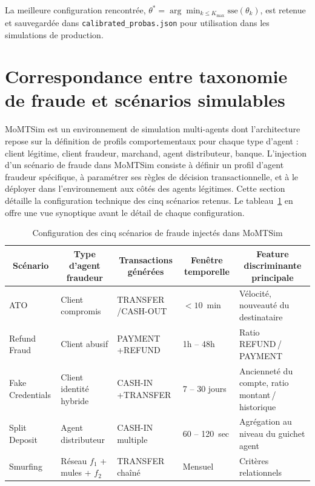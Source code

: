 \documentclass[11pt,a4paper,oneside]{report}
\theoremstyle{definition}
\theoremstyle{remark}
\begin{document}
La meilleure configuration rencontrée, $\theta^* = \arg\min_{k \leq K_\text{max}} \text{sse}(\theta_k)$, est retenue et sauvegardée dans \texttt{calibrated\_probas.json} pour utilisation dans les simulations de production.

\section{Correspondance entre taxonomie de fraude et scénarios simulables}
\label{sec:scenarios}

MoMTSim est un environnement de simulation multi-agents dont l'architecture repose sur la définition de profils comportementaux pour chaque type d'agent : client légitime, client fraudeur, marchand, agent distributeur, banque. L'injection d'un scénario de fraude dans MoMTSim consiste à définir un profil d'agent fraudeur spécifique, à paramétrer ses règles de décision transactionnelle, et à le déployer dans l'environnement aux côtés des agents légitimes. Cette section détaille la configuration technique des cinq scénarios retenus. Le tableau~\ref{tab:scenarios_momtsim} en offre une vue synoptique avant le détail de chaque configuration.

\begin{table}[H]
\centering
\small
\caption{Configuration des cinq scénarios de fraude injectés dans MoMTSim}
\label{tab:scenarios_momtsim}
\renewcommand{\arraystretch}{1.6}
\begin{tabular}{@{}
  p{2.2cm}
  p{2.8cm}
  p{2.5cm}
  p{1.8cm}
  p{4.0cm}
@{}}
\toprule
\multicolumn{1}{c}{\textbf{Scénario}}
  & \multicolumn{1}{c}{\textbf{Type d'agent fraudeur}}
  & \multicolumn{1}{c}{\textbf{Transactions générées}}
  & \multicolumn{1}{c}{\textbf{Fenêtre temporelle}}
  & \multicolumn{1}{c}{\textbf{Feature discriminante principale}} \\
\midrule
ATO
  & Client compromis
  & TRANSFER /\newline CASH-OUT
  & $<10$~min
  & Vélocité, nouveauté du destinataire \\[4pt]
Refund Fraud
  & Client abusif
  & PAYMENT +\newline REFUND
  & 1h -- 48h
  & Ratio REFUND\,/\,PAYMENT \\[4pt]
Fake Credentials
  & Client identité hybride
  & CASH-IN +\newline TRANSFER
  & 7 -- 30 jours
  & Ancienneté du compte, ratio montant\,/\,historique \\[4pt]
Split Deposit
  & Agent distributeur
  & CASH-IN multiple
  & 60 -- 120~sec
  & Agrégation au niveau du guichet agent \\[4pt]
Smurfing
  & Réseau $f_1$ + mules + $f_2$
  & TRANSFER chaîné
  & Mensuel
  & Critères relationnels \citet{zhdanova2014smurfs} \\
\bottomrule
\end{tabular}
\end{table}
\end{document}
